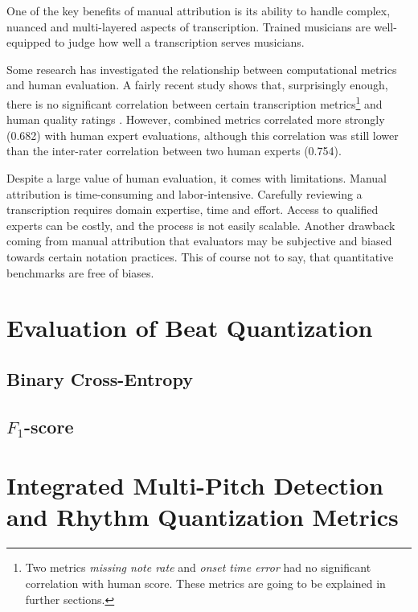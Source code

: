 One of the key benefits of manual attribution is its ability to handle complex, nuanced and multi-layered aspects of transcription. Trained musicians are well-equipped to judge how well a transcription serves musicians.

Some research has investigated the relationship between computational metrics and human evaluation. A fairly recent study shows that, surprisingly enough, there is no significant correlation between certain transcription metrics\footnote{Two metrics \emph{missing note rate} and \emph{onset time error} had no significant correlation with human score. These metrics are going to be explained in further sections.} and human quality ratings \cite{Holzapfel2021}. However, combined metrics correlated more strongly (0.682) with human expert evaluations, although this correlation was still lower than the inter-rater correlation between two human experts (0.754).

Despite a large value of human evaluation, it comes with limitations. Manual attribution is time-consuming and labor-intensive. Carefully reviewing a transcription requires domain expertise, time and effort. Access to qualified experts can be costly, and the process is not easily scalable. Another drawback coming from manual attribution that evaluators may be subjective and biased towards certain notation practices. This of course not to say, that quantitative benchmarks are free of biases.

\section{Evaluation of Beat Quantization}

\missing

\subsection{Binary Cross-Entropy}

\missing

\subsection{$F_1$-score}

\missing

\section{Integrated Multi-Pitch Detection and Rhythm Quantization Metrics}

